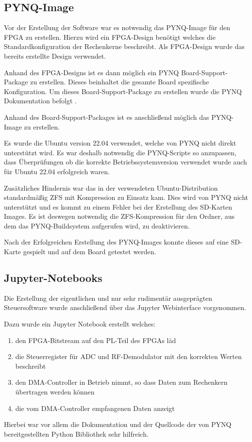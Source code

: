 \subsection{\acs{PYNQ}-Image}
Vor der Erstellung der Software war es notwendig das \acs{PYNQ}-Image für den \acs{FPGA} zu erstellen.
Hierzu wird ein \acs{FPGA}-Design benötigt welches die Standardkonfiguration der Rechenkerne beschreibt. Als \acs{FPGA}-Design wurde das bereits erstellte Design verwendet.

Anhand des \acs{FPGA}-Designs ist es dann möglich ein \acs{PYNQ} Board-Support-Package zu erstellen. Dieses beinhaltet die gesamte Board spezifische Konfiguration.
Um dieses Board-Support-Package zu erstellen wurde die \acs{PYNQ} Dokumentation befolgt \cite{PYNQ_SD_CARD}.

Anhand des Board-Support-Packages ist es anschließend möglich das \acs{PYNQ}-Image zu erstellen.

Es wurde die Ubuntu version 22.04 verwendet, welche von \acs{PYNQ} nicht direkt unterstützt wird. 
Es war deshalb notwendig die \acs{PYNQ}-Scripte so anzupassen, dass Überprüfungen ob die korrekte Betriebssystemversion verwendet wurde auch für Ubuntu 22.04 erfolgreich waren.

Zusätzliches Hindernis war das in der verwendeten Ubuntu-Distribution standardmäßig \acs{ZFS} mit Kompression zu Einsatz kam.
Dies wird von \acs{PYNQ} nicht unterstützt und es kommt zu einem Fehler bei der Erstellung des SD-Karten Images.
Es ist deswegen notwendig die \acs{ZFS}-Kompression für den Ordner, aus dem das \acs{PYNQ}-Buildsystem aufgerufen wird, zu deaktivieren.

Nach der Erfolgreichen Erstellung des \acs{PYNQ}-Images konnte dieses auf eine SD-Karte gespielt und auf dem Board getestet werden.

\subsection{Jupyter-Notebooks}
Die Erstellung der eigentlichen und nur sehr rudimentär ausgeprägten Steuersoftware wurde anschließend über das Jupyter Webinterface vorgenommen.

Dazu wurde ein Jupyter Notebook erstellt welches:
\begin{enumerate}[label*=\arabic*.]
	\item den \acs{FPGA}-Bitstream auf den PL-Teil des \acs{FPGA}s läd
	\item die Steuerregister für \acs{ADC} und RF-Demodulator mit den korrekten Werten beschreibt
	\item den \acs{DMA}-Controller in Betrieb nimmt, so dass Daten zum Rechenkern übertragen werden können
	\item die vom \acs{DMA}-Controller empfangenen Daten anzeigt
\end{enumerate} 

Hierbei war vor allem die Dokumentation und der Quellcode der von \acs{PYNQ} bereitgestellten Python Bibliothek sehr hilfreich\cite{PYNQ_PYHTON}.
